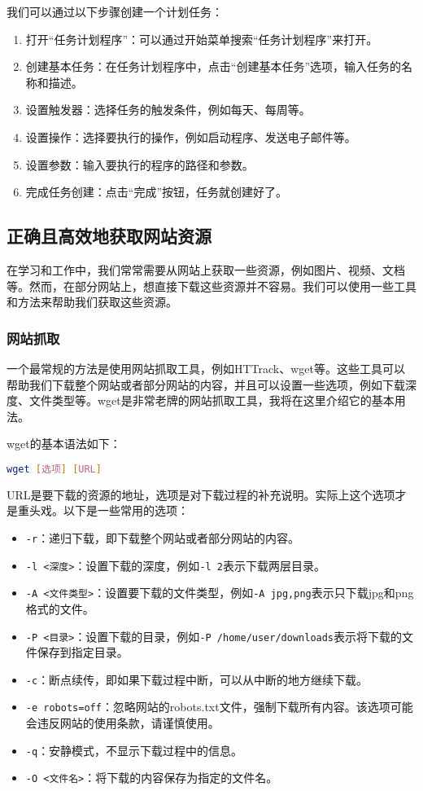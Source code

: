 我们可以通过以下步骤创建一个计划任务：
\begin{enumerate}
  \item 打开“任务计划程序”：可以通过开始菜单搜索“任务计划程序”来打开。
  \item 创建基本任务：在任务计划程序中，点击“创建基本任务”选项，输入任务的名称和描述。
  \item 设置触发器：选择任务的触发条件，例如每天、每周等。
  \item 设置操作：选择要执行的操作，例如启动程序、发送电子邮件等。
  \item 设置参数：输入要执行的程序的路径和参数。
  \item 完成任务创建：点击“完成”按钮，任务就创建好了。
\end{enumerate}

\subsection{正确且高效地获取网站资源}

在学习和工作中，我们常常需要从网站上获取一些资源，例如图片、视频、文档等。然而，在部分网站上，想直接下载这些资源并不容易。我们可以使用一些工具和方法来帮助我们获取这些资源。

\subsubsection{网站抓取}

一个最常规的方法是使用网站抓取工具，例如HTTrack、wget等。这些工具可以帮助我们下载整个网站或者部分网站的内容，并且可以设置一些选项，例如下载深度、文件类型等。wget是非常老牌的网站抓取工具，我将在这里介绍它的基本用法。

wget的基本语法如下：
\begin{lstlisting}[language=bash]
    wget [选项] [URL]
\end{lstlisting}
URL是要下载的资源的地址，选项是对下载过程的补充说明。实际上这个选项才是重头戏。以下是一些常用的选项：
\begin{itemize}
  \item \texttt{-r}：递归下载，即下载整个网站或者部分网站的内容。
  \item \texttt{-l <深度>}：设置下载的深度，例如\texttt{-l 2}表示下载两层目录。
  \item \texttt{-A <文件类型>}：设置要下载的文件类型，例如\texttt{-A jpg,png}表示只下载jpg和png格式的文件。
  \item \texttt{-P <目录>}：设置下载的目录，例如\texttt{-P /home/user/downloads}表示将下载的文件保存到指定目录。
  \item \texttt{-c}：断点续传，即如果下载过程中断，可以从中断的地方继续下载。
  \item \texttt{-e robots=off}：忽略网站的robots.txt文件，强制下载所有内容。该选项可能会违反网站的使用条款，请谨慎使用。
  \item \texttt{-q}：安静模式，不显示下载过程中的信息。
  \item \texttt{-O <文件名>}：将下载的内容保存为指定的文件名。
\end{itemize}

